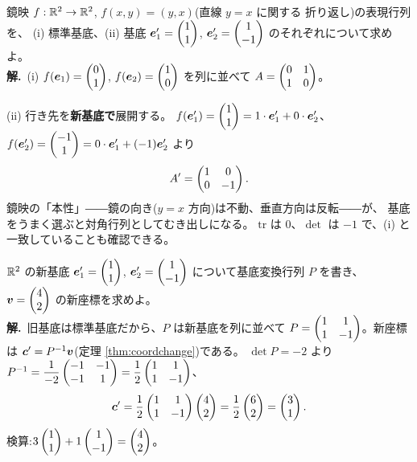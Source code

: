 \begin{rei}[例題・基本(うまい基底なら対角になる)]\label{rei:repmat-mirror}
鏡映 $f : \mathbb{R}^2 \to \mathbb{R}^2$, $f(x, y) = (y, x)$(直線 $y = x$ に関する
折り返し)の表現行列を、
(i) 標準基底、(ii) 基底 $\bm{e}'_1 = \begin{pmatrix}1 \\ 1\end{pmatrix}$,
$\bm{e}'_2 = \begin{pmatrix}1 \\ -1\end{pmatrix}$ のそれぞれについて求めよ。\\
\textbf{解.}\ (i) $f(\bm{e}_1) = \begin{pmatrix}0 \\ 1\end{pmatrix}$,
$f(\bm{e}_2) = \begin{pmatrix}1 \\ 0\end{pmatrix}$ を列に並べて
$A = \begin{pmatrix}0 & 1 \\ 1 & 0\end{pmatrix}$。

(ii) 行き先を\textbf{新基底で}展開する。
$f(\bm{e}'_1) = \begin{pmatrix}1 \\ 1\end{pmatrix} = 1 \cdot \bm{e}'_1 + 0 \cdot \bm{e}'_2$、
$f(\bm{e}'_2) = \begin{pmatrix}-1 \\ 1\end{pmatrix} = 0 \cdot \bm{e}'_1 + (-1)\bm{e}'_2$
より
\[
A' = \begin{pmatrix}1 & 0 \\ 0 & -1\end{pmatrix}.
\]
鏡映の「本性」――鏡の向き($y = x$ 方向)は不動、垂直方向は反転――が、
基底をうまく選ぶと対角行列としてむき出しになる。
$\mathrm{tr}$ は $0$、$\det$ は $-1$ で、(i) と一致していることも確認できる。
\end{rei}

\begin{rei}[例題・基本(座標の変換)]\label{rei:repmat-coordchg}
$\mathbb{R}^2$ の新基底 $\bm{e}'_1 = \begin{pmatrix}1 \\ 1\end{pmatrix}$,
$\bm{e}'_2 = \begin{pmatrix}1 \\ -1\end{pmatrix}$ について基底変換行列 $P$ を書き、
$\bm{v} = \begin{pmatrix}4 \\ 2\end{pmatrix}$ の新座標を求めよ。\\
\textbf{解.}\ 旧基底は標準基底だから、$P$ は新基底を列に並べて
$P = \begin{pmatrix}1 & 1 \\ 1 & -1\end{pmatrix}$。新座標は
$\bm{c}' = P^{-1}\bm{v}$(定理 \ref{thm:coordchange})である。
$\det P = -2$ より
$P^{-1} = \dfrac{1}{-2}\begin{pmatrix}-1 & -1 \\ -1 & 1\end{pmatrix}
= \dfrac{1}{2}\begin{pmatrix}1 & 1 \\ 1 & -1\end{pmatrix}$、
\[
\bm{c}' = \frac{1}{2}\begin{pmatrix}1 & 1 \\ 1 & -1\end{pmatrix}\begin{pmatrix}4 \\ 2\end{pmatrix}
= \frac{1}{2}\begin{pmatrix}6 \\ 2\end{pmatrix} = \begin{pmatrix}3 \\ 1\end{pmatrix}.
\]
検算:$3\begin{pmatrix}1 \\ 1\end{pmatrix} + 1\begin{pmatrix}1 \\ -1\end{pmatrix} = \begin{pmatrix}4 \\ 2\end{pmatrix}$。
\end{rei}


